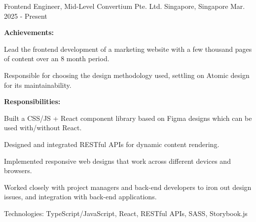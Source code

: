 

\begin{cventries}

  \cventry
    {Frontend Engineer, Mid-Level} %
    {Convertium Pte. Ltd.} %
    {Singapore, Singapore} %
    {Mar. 2025 - Present} %
    {
      \textbf{Achievements:}
      \vspace{1.5em}
      \begin{cvitems} %
        \item {Lead the frontend development of a marketing website with a few thousand pages of content over an 8 month period.}
        \item {Responsible for choosing the design methodology used, settling on Atomic design for its maintainability.}
      \end{cvitems}
      \vspace{1.5em}
      \textbf{Responsibilities:}
      \vspace{1.5em}
      \begin{cvitems} %
        \item {Built a CSS/JS + React component library based on Figma designs which can be used with/without React.}
        \item {Designed and integrated RESTful APIs for dynamic content rendering.}
        \item {Implemented responsive web designs that work across different devices and browsers.}
        \item {Worked closely with project managers and back-end developers to iron out design issues, and integration with back-end applications.}
        \item {Technologies: TypeScript/JavaScript, React, RESTful APIs, SASS, Storybook.js}
      \end{cvitems}
    }


\end{cventries}
